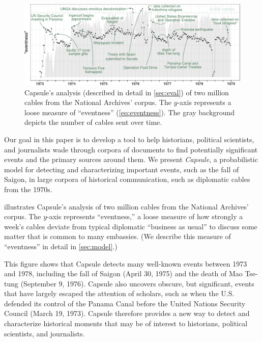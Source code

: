\begin{figure}[ht]
\centering
\includegraphics[width=\linewidth]{fig/cables_events.pdf}
\caption{Capsule's analysis  (described in detail in \cref{sec:eval}) of two million cables from the National
  Archives' corpus. The $y$-axis represents a loose measure of
  ``eventness'' (\cref{eq:eventness}). The gray background depicts the
  number of cables sent over time.}
\label{fig:cables_events}
\end{figure}

Our goal in this paper is to develop a tool to help historians,
political scientists, and journalists wade through corpora of
documents to find potentially significant events and the primary
sources around them. We present \textit{Capsule}, a probabilistic
model for detecting and characterizing important events, such as the
fall of Saigon, in large corpora of historical communication, such as
diplomatic cables from the 1970s.

 illustrates Capsule's analysis of two million
cables from the National Archives' corpus. The \mbox{$y$-axis}
represents ``eventness,'' a loose measure of how strongly a week's
cables deviate from typical diplomatic ``business as usual'' to
discuss some matter that is common to many embassies. (We describe
this measure of ``eventness'' in detail in \cref{sec:model}.)

This figure shows that Capsule detects many well-known events
between 1973 and 1978, including the fall of Saigon (April 30, 1975)
and the death of Mao Tse-tung (September 9, 1976). Capsule also uncovers obscure, but significant, events that have largely escaped
the attention of scholars, such as when the U.S. defended its
control of the Panama Canal before the United Nations Security Council (March 19, 1973).
Capsule therefore provides a new way to detect and characterize historical
moments that may be of interest to historians, political scientists,
and journalists.

